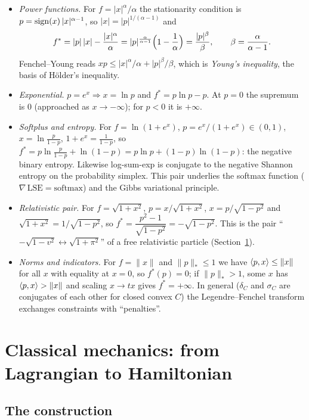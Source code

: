 \begin{itemize}
  \item \emph{Power functions.} For $f=|x|^\alpha/\alpha$ the stationarity
  condition is $p=\operatorname{sign}(x)\,|x|^{\alpha-1}$, so $|x|=|p|^{1/(\alpha-1)}$ and
  \[
    f^*=|p|\,|x|-\frac{|x|^\alpha}{\alpha}
       =|p|^{\frac{\alpha}{\alpha-1}}\Bigl(1-\frac1\alpha\Bigr)=\frac{|p|^\beta}{\beta},
    \qquad \beta=\frac{\alpha}{\alpha-1}.
  \]
  Fenchel--Young reads $xp\le|x|^\alpha/\alpha+|p|^\beta/\beta$, which is
  \emph{Young's inequality}, the basis of H\"older's inequality.
  \item \emph{Exponential.} $p=e^x\Rightarrow x=\ln p$ and
  $f^*=p\ln p-p$.  At $p=0$ the supremum is $0$ (approached as
  $x\to-\infty$); for $p<0$ it is $+\infty$.
  \item \emph{Softplus and entropy.} For $f=\ln(1+e^x)$, $p=e^x/(1+e^x)\in(0,1)$,
  $x=\ln\frac p{1-p}$, $1+e^x=\frac1{1-p}$, so
  $f^*=p\ln\frac p{1-p}+\ln(1-p)=p\ln p+(1-p)\ln(1-p)$:
  the negative binary entropy.  Likewise log-sum-exp is conjugate to the
  negative Shannon entropy on the probability simplex.  This pair underlies
  the softmax function ($\nabla\,\mathrm{LSE}=\mathrm{softmax}$) and
  the Gibbs variational principle.
  \item \emph{Relativistic pair.} For $f=\sqrt{1+x^2}$, $p=x/\sqrt{1+x^2}$,
  $x=p/\sqrt{1-p^2}$ and $\sqrt{1+x^2}=1/\sqrt{1-p^2}$, so
  $f^*=\dfrac{p^2-1}{\sqrt{1-p^2}}=-\sqrt{1-p^2}$.  This is the pair
  ``$-\sqrt{1-v^2}\leftrightarrow\sqrt{1+\pi^2}$'' of a free relativistic
  particle (Section~\ref{sec:mech}).
  \item \emph{Norms and indicators.} For $f=\|x\|$ and $\|p\|_*\le1$ we have
  $\langle p,x\rangle\le\|x\|$ for all $x$ with equality at $x=0$, so $f^*(p)=0$; if
  $\|p\|_*>1$, some $x$ has $\langle p,x\rangle>\|x\|$ and scaling $x\to tx$ gives
  $f^*=+\infty$.  In general ($\delta_C$ and $\sigma_C$ are conjugates of each
  other for closed convex $C$) the Legendre--Fenchel transform exchanges
  constraints with ``penalties''.
\end{itemize}

\section{Classical mechanics: from Lagrangian to Hamiltonian}\label{sec:mech}

\subsection{The construction}

